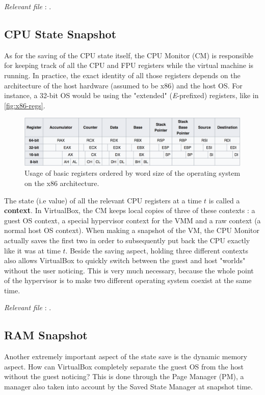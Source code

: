 \hfill\textit{Relevant file }: .

\subsection*{CPU State Snapshot}

As for the saving of the CPU state itself, the CPU Monitor (CM) is responsible for keeping track of all the CPU and \gls{FPU} registers while the virtual machine is running. In practice, the exact identity of all those registers depends on the architecture of the host hardware (assumed to be x86) and the host OS. For instance, a 32-bit OS would be using the "extended" (\textit{E}-prefixed) registers, like in \autoref{fig:x86-regs}. 
\begin{figure}[H]
	\centering
	\includegraphics[width=.85\linewidth,keepaspectratio]{art/x86-regs.png}
	\caption{Usage of basic registers ordered by word size of the operating system on the x86 architecture.}
	\label{fig:x86-regs}
\end{figure}
The state (i.e value) of all the relevant CPU registers at a time $t$ is called a \textbf{context}. In VirtualBox, the CM keeps local copies of three of these contexts : a guest OS context, a special hypervisor context for the VMM and a raw context (a normal host OS context). When making a snapshot of the VM, the CPU Monitor actually saves the first two in order to subsequently put back the CPU exactly like it was at time $t$. Beside the saving aspect, holding three different contexts also allows VirtualBox to quickly switch between the guest and host "worlds" without the user noticing. This is very much necessary, because the whole point of the hypervisor is to make two different operating system coexist at the same time.

\hfill\textit{Relevant file }: .

\subsection*{RAM Snapshot}

Another extremely important aspect of the state save is the dynamic memory aspect. How can VirtualBox completely separate the guest OS from the host without the guest noticing? This is done through the Page Manager (PM), a manager also taken into account by the Saved State Manager at snapshot time. 

